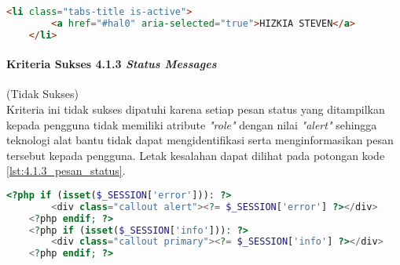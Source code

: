 \begin{lstlisting}[frame=single, label={lst:4.1.2_role_halaman_lihat_jadwal_dosen}, language=HTML, caption=Kriteria Sukses 4.1.1 - Atribut \textit{Role} pada Halaman Lihat Jadwal Dosen]
    <li class="tabs-title is-active">
        <a href="#hal0" aria-selected="true">HIZKIA STEVEN</a>
    </li> 
\end{lstlisting}

\paragraph{Kriteria Sukses 4.1.3 \textit{Status Messages}}
\label{par:kepatuhan_bluetape_kriteria_sukses_4.1.3}
(Tidak Sukses)\\

Kriteria ini tidak sukses dipatuhi karena setiap pesan status yang ditampilkan kepada pengguna tidak memiliki atribute \textit{"role"} dengan nilai \textit{"alert"} sehingga teknologi alat bantu tidak dapat mengidentifikasi serta menginformasikan pesan tersebut kepada pengguna. Letak kesalahan dapat dilihat pada potongan kode \ref{lst:4.1.3_pesan_status}.

\begin{lstlisting}[frame=single, label={lst:4.1.3_pesan_status}, language=PHP, caption=Kriteria Sukses 4.1.3 - Atribut pada Pesan Status]
    <?php if (isset($_SESSION['error'])): ?>
        <div class="callout alert"><?= $_SESSION['error'] ?></div>
    <?php endif; ?>
    <?php if (isset($_SESSION['info'])): ?>
        <div class="callout primary"><?= $_SESSION['info'] ?></div>
    <?php endif; ?>
\end{lstlisting}